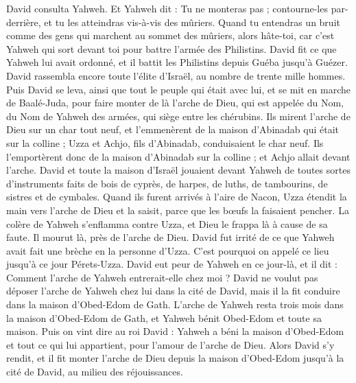 \begin{multicols}{2}
David consulta Yahweh. Et Yahweh dit : Tu ne monteras pas ; contourne-les par-derrière, et tu les atteindras vis-à-vis des mûriers.
Quand tu entendras un bruit comme des gens qui marchent au sommet des mûriers, alors hâte-toi, car c’est Yahweh qui sort devant toi pour battre l’armée des Philistins.
David fit ce que Yahweh lui avait ordonné, et il battit les Philistins depuis Guéba jusqu'à Guézer.
\VerseOne{}David rassembla encore toute l'élite d'Israël, au nombre de trente mille hommes.
Puis David se leva, ainsi que tout le peuple qui était avec lui, et se mit en marche de Baalé-Juda, pour faire monter de là l'arche de Dieu, qui est appelée du Nom, du Nom de Yahweh des armées, qui siège entre les chérubins.
Ils mirent l'arche de Dieu sur un char tout neuf, et l'emmenèrent de la maison d'Abinadab qui était sur la colline ; Uzza et Achjo, fils d'Abinadab, conduisaient le char neuf.
Ils l’emportèrent donc de la maison d'Abinadab sur la colline ; et Achjo allait devant l'arche.
David et toute la maison d'Israël jouaient devant Yahweh de toutes sortes d'instruments faits de bois de cyprès, de harpes, de luths, de tambourins, de sistres et de cymbales.
Quand ils furent arrivés à l'aire de Nacon, Uzza étendit la main vers l'arche de Dieu et la saisit, parce que les bœufs la faisaient pencher.
La colère de Yahweh s'enflamma contre Uzza, et Dieu le frappa là à cause de sa faute. Il mourut là, près de l'arche de Dieu.
David fut irrité de ce que Yahweh avait fait une brèche en la personne d’Uzza. C’est pourquoi on appelé ce lieu jusqu'à ce jour Pérets-Uzza.
David eut peur de Yahweh en ce jour-là, et il dit : Comment l'arche de Yahweh entrerait-elle chez moi ?
David ne voulut pas déposer l'arche de Yahweh chez lui dans la cité de David, mais il la fit conduire dans la maison d'Obed-Edom de Gath.
L'arche de Yahweh resta trois mois dans la maison d'Obed-Edom de Gath, et Yahweh bénit Obed-Edom et toute sa maison.
Puis on vint dire au roi David : Yahweh a béni la maison d'Obed-Edom et tout ce qui lui appartient, pour l’amour de l'arche de Dieu. Alors David s'y rendit, et il fit monter l'arche de Dieu depuis la maison d'Obed-Edom jusqu’à la cité de David, au milieu des réjouissances.

\end{multicols}
